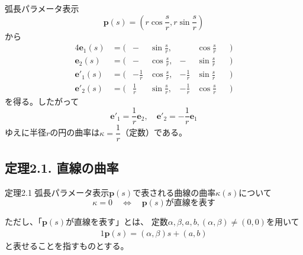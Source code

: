 \documentclass[a4j,disablejfam,dvipdfmx,papersize,slide,uplatex,21pt]{jsarticle}
\begin{document}
\newpage
弧長パラメータ表示
\begin{equation}
    \bm{p}(s) = \left(r \cos \frac{s}{r}, r \sin \frac{s}{r}\right)
\end{equation}
から
\begin{alignat}{4}
    \bm{e}_1(s) &=  \bigl(&- &\sin \frac{s}{r},& &\cos \frac{s}{r} &&\bigr) \\
    \bm{e}_2(s) &=  \bigl(&- &\cos \frac{s}{r},& -&\sin \frac{s}{r} &&\bigr) \\
    \bm{e}'_1(s) &= \bigl(&- \frac{1}{r} &\cos \frac{s}{r},& - \frac{1}{r} &\sin \frac{s}{r} &&\bigr) \\
    \bm{e}'_2(s) &= \bigl(&\frac{1}{r} &\sin \frac{s}{r},& - \frac{1}{r} &\cos \frac{s}{r} &&\bigr)
\end{alignat}
を得る。したがって
\begin{equation}
    \bm{e}'_1 = \frac{1}{r} \bm{e}_2,\quad
    \bm{e}'_2 = -\frac{1}{r} \bm{e}_1
\end{equation}
ゆえに半径$r$の円の曲率は$\kappa = \dfrac{1}{r}$（定数）である。

\newpage
\subsection*{定理2.1. 直線の曲率}
\begin{itembox}[l]{定理2.1}
    弧長パラメータ表示$\bm{p}(s)$で表される曲線の曲率$\kappa(s)$について
    \begin{equation}
        \kappa = 0 \quad \Longleftrightarrow \quad \text{$\bm{p}(s)$が直線を表す}
    \end{equation}
\end{itembox}

ただし、「$\bm{p}(s)$が直線を表す」とは、
定数$\alpha, \beta, a, b, (\alpha, \beta) \neq (0, 0)$を用いて
\begin{alignat}{1}
    \bm{p}(s) = (\alpha, \beta) s + (a, b)
\end{alignat}
と表せることを指すものとする。
\end{document}
